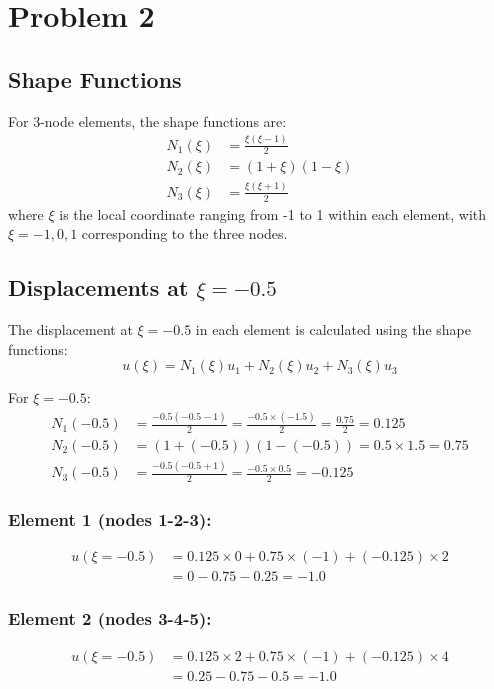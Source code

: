 \documentclass[12pt,a4paper]{article}
\begin{document}
\section{Problem 2}

\subsection{Shape Functions}
For 3-node elements, the shape functions are:
\begin{align}
N_1(\xi) &= \frac{\xi(\xi-1)}{2} \\
N_2(\xi) &= (1+\xi)(1-\xi) \\
N_3(\xi) &= \frac{\xi(\xi+1)}{2}
\end{align}
where $\xi$ is the local coordinate ranging from -1 to 1 within each element, with $\xi = -1, 0, 1$ corresponding to the three nodes.

\subsection{Displacements at $\xi = -0.5$}
The displacement at $\xi = -0.5$ in each element is calculated using the shape functions:
\begin{equation}
u(\xi) = N_1(\xi)u_1 + N_2(\xi)u_2 + N_3(\xi)u_3
\end{equation}

For $\xi = -0.5$:
\begin{align}
N_1(-0.5) &= \frac{-0.5(-0.5-1)}{2} = \frac{-0.5 \times (-1.5)}{2} = \frac{0.75}{2} = 0.125 \\
N_2(-0.5) &= (1+(-0.5))(1-(-0.5)) = 0.5 \times 1.5 = 0.75 \\
N_3(-0.5) &= \frac{-0.5(-0.5+1)}{2} = \frac{-0.5 \times 0.5}{2} = -0.125
\end{align}

\subsubsection*{Element 1 (nodes 1-2-3):}
\begin{align}
u(\xi=-0.5) &= 0.125 \times 0 + 0.75 \times (-1) + (-0.125) \times 2 \\
&= 0 - 0.75 - 0.25 = -1.0
\end{align}

\subsubsection*{Element 2 (nodes 3-4-5):}
\begin{align}
u(\xi=-0.5) &= 0.125 \times 2 + 0.75 \times (-1) + (-0.125) \times 4 \\
&= 0.25 - 0.75 - 0.5 = -1.0
\end{align}
\end{document}
